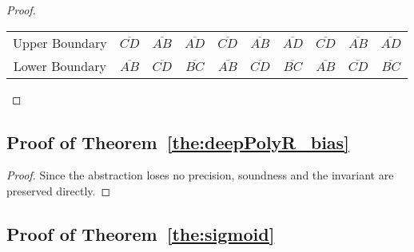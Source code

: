 \begin{proof}
\begin{table}[h]
{\begin{tabular}{c|c|c|c|c|c|c|c|c|c}
     Upper Boundary& $\overline{CD}$ & $\overline{AB}$ & $\overline{AD}$ & $\overline{CD}$ & $\overline{AB}$ & $\overline{AD}$ & $\overline{CD}$ & $\overline{AB}$ & $\overline{AD}$\\ 
     Lower Boundary& $\overline{AB}$ & $\overline{CD}$ & $\overline{BC}$ & $\overline{AB}$ & $\overline{CD}$ & $\overline{BC}$ & $\overline{AB}$ & $\overline{CD}$ & $\overline{BC}$ \\ 
     
    \bottomrule
    \end{tabular}}
\end{table}

\end{proof}

\subsection{Proof of Theorem~\ref{the:deepPolyR_bias}}

\begin{proof}
    Since the abstraction loses no precision, soundness and the invariant are preserved directly.
\end{proof}



\subsection{Proof of Theorem~\ref{the:sigmoid}}

